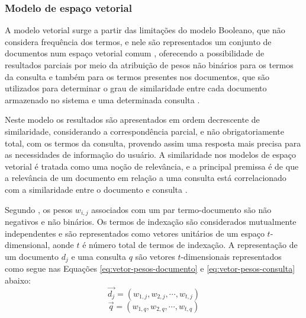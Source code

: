 \subsubsection{Modelo de espaço vetorial} \label{subsubsec:Modelo-espaço-vetorial}



    A modelo vetorial surge a partir das limitações do modelo Booleano, que não considera frequência dos termos, e nele são representados um conjunto de documentos num espaço vetorial comum \cite[p.~110]{Manning2008IIR}, oferecendo a possibilidade de resultados parciais por meio da atribuição de pesos não binários para os termos da consulta e também para os termos presentes nos documentos, que são utilizados para determinar o grau de similaridade entre cada documento armazenado no sistema e uma determinada consulta \cite[p.~77]{Baeza-Yates2011}.
    
    Neste modelo os resultados são apresentados em ordem decrescente de similaridade, considerando a correspondência parcial, e não obrigatoriamente total, com os termos da consulta, provendo assim uma resposta mais precisa para as necessidades de informação do usuário.
    A similaridade nos modelos de espaço vetorial é tratada como uma noção de relevância, e a principal premissa é de que a relevância de um documento em relação a uma consulta está correlacionado com a similaridade entre o documento e consulta \cite[p.~110]{Zhai2016TDMA}.
    
    Segundo , os pesos $w_{i,j}$ associados com um par termo-documento são não negativos e não binários.
    Os termos de indexação são considerados mutualmente independentes e são representados como vetores unitários de um espaço $t$-dimensional, aonde $t$ é número total de termos de indexação.
    A representação de um documento $d_j$ e uma consulta $q$ são vetores $t$-dimensionais representados como segue nas Equações \ref{eq:vetor-pesos-documento} e \ref{eq:vetor-pesos-consulta} abaixo:
    \begin{equation}
        \label{eq:vetor-pesos-documento}
		\vec{d_j} = (w_{1,j}, w_{2,j}, \cdots , w_{t,j})
    \end{equation}
    \begin{equation}
        \label{eq:vetor-pesos-consulta}
		\vec{q} = (w_{1,q}, w_{2,q}, \cdots , w_{t,q})
    \end{equation}
    
